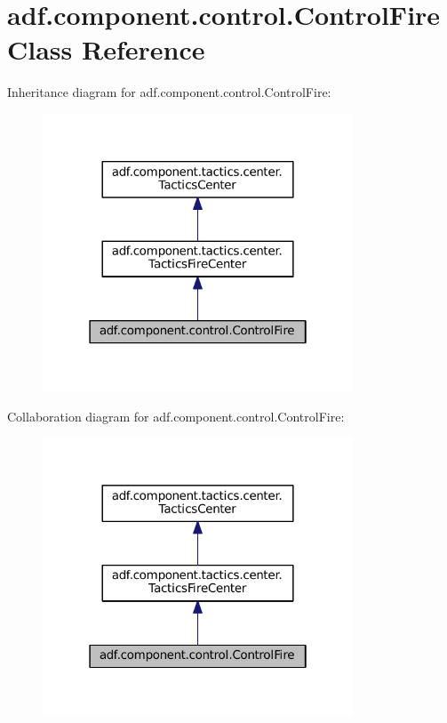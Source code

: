 \hypertarget{classadf_1_1component_1_1control_1_1ControlFire}{}\section{adf.\+component.\+control.\+Control\+Fire Class Reference}
\label{classadf_1_1component_1_1control_1_1ControlFire}


Inheritance diagram for adf.\+component.\+control.\+Control\+Fire\+:
\nopagebreak
\begin{figure}[H]
\begin{center}
\leavevmode
\includegraphics[width=262pt]{classadf_1_1component_1_1control_1_1ControlFire__inherit__graph}
\end{center}
\end{figure}


Collaboration diagram for adf.\+component.\+control.\+Control\+Fire\+:
\nopagebreak
\begin{figure}[H]
\begin{center}
\leavevmode
\includegraphics[width=262pt]{classadf_1_1component_1_1control_1_1ControlFire__coll__graph}
\end{center}
\end{figure}
